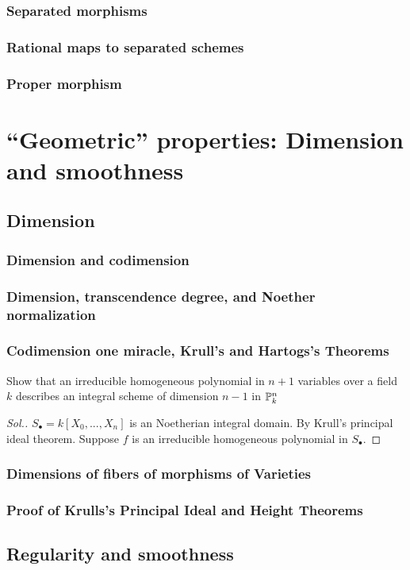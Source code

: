 \documentclass[11pt]{book} %
\begin{document}
\section{Separated morphisms}
\section{Rational maps to separated schemes}
\section{Proper morphism}
\part{``Geometric'' properties: Dimension and smoothness}
\chapter{Dimension}
\section{Dimension and codimension}
\section{Dimension, transcendence degree, and Noether normalization}
\section{Codimension one miracle, Krull's and Hartogs's Theorems}
\begin{exr}
Show that an irreducible homogeneous polynomial in $n+1$ variables over a field $k$ describes an integral scheme of dimension $n-1$ in $\mathbb P^n_k$ 
\end{exr}
\begin{proof}[Sol.]
$S_\bullet=k[X_0,...,X_n]$ is an Noetherian integral domain. By Krull's principal ideal theorem. Suppose $f$ is an irreducible homogeneous polynomial in $S_\bullet$.
\end{proof}
\section{Dimensions of fibers of morphisms of Varieties}
\section{Proof of Krulls's Principal Ideal and Height Theorems}
\chapter{Regularity and smoothness}
\end{document}
